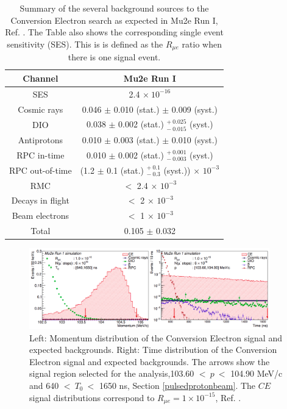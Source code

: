 \begin{center}  
\begin{table}[!h]
\centering
\renewcommand{\arraystretch}{1.2}
\begin{tabular}{| c | c |}
\hline
\textbf{Channel} & \textbf{Mu2e Run I}\\
\hline
SES & 2.4 $\times \ 10^{-16}$ \\
\hline
Cosmic rays & 0.046 $\pm$ 0.010 (stat.) $\pm$ 0.009 (syst.) \\
DIO & 0.038 $\pm$ 0.002 (stat.) $ ^{+ \ 0.025} _{- \ 0.015}$ (syst.)\\
Antiprotons & 0.010 $\pm$ 0.003 (stat.) $\pm$ 0.010 (syst.) \\
RPC in-time & 0.010 $\pm$ 0.002 (stat.) $ ^{+ \ 0.001} _{- \ 0.003}$ (syst.)\\
RPC out-of-time & (1.2 $\pm$ 0.1  (stat.) $ ^{+ \ 0.1} _{- \ 0.3}$ (syst.)) $\times$ $10^{-3}$ \\
RMC & $<$ 2.4 $\times$ $10^{-3}$ \\
Decays in flight & $<$ 2 $\times$ $10^{-3}$ \\
Beam electrons & $<$ 1 $\times$ $10^{-3}$ \\
\hline
Total &  0.105 $\pm$ 0.032\\
\hline
\end{tabular}
\caption[Summary of background sources to 
the Conversion Electron search as expected in Mu2e Run I.]{Summary of the several background sources to 
the Conversion Electron search as expected in Mu2e Run I,  Ref. \cite{universe9010054}. The Table also shows the corresponding single event sensitivity (SES). This is is defined as the $R_{\mu e}$ ratio when there is one signal event.}
\end{table}\label{tab:summarybkg}
\end{center}
\begin{figure}[!h]
\centering
\includegraphics[width =0.93\textwidth]{figures/png/Screenshot_20240225_102708.png}
\caption[Mu2e simulated signal.]{Left: Momentum distribution of the Conversion Electron signal and expected backgrounds. Right: Time distribution of the Conversion Electron signal and expected backgrounds. The arrows show the signal region selected for the analysis,103.60 $< \ p \ < $ 104.90 MeV/c and 640 $< \ T_0 \ < $ 1650 ns, Section \ref{pulsedprotonbeam}. The $CE$ signal distributions correspond to $R_{\mu e} = 1 \times 10^{-15}$, Ref. \cite{universe9010054}.}
\label{fig:sensitivity}
\end{figure}
